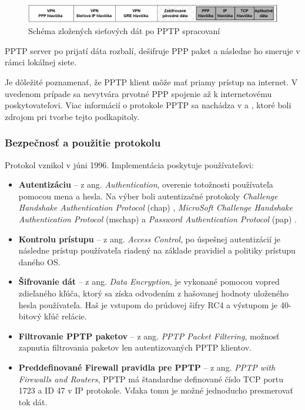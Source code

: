 \begin{figure}[!h]
	\centering
	\includegraphics[width=\textwidth]{figures/pptpdat}
	\caption{Schéma zložených sieťových dát po PPTP spracovaní}
	\label{pptpdat}
\end{figure}

PPTP server po prijatí dáta rozbalí, dešifruje PPP paket a následne ho smeruje v rámci lokálnej siete.

Je dôležité poznamenať, že PPTP klient môže mať priamy prístup na internet. V uvedenom prípade sa nevytvára prvotné PPP spojenie až k internetovému poskytovateľovi.
Viac informácií o protokole PPTP sa nachádza v \cite{rfc2637} a \cite{pptp}, ktoré boli zdrojom pri tvorbe tejto podkapitoly.
\subsubsection{Bezpečnosť a použitie protokolu} 
Protokol vznikol v júni 1996. Implementácia poskytuje používateľovi:
\begin{itemize}
	\item{\textbf{Autentizáciu}} -- z ang. \textit{Authentication}, overenie totožnosti používateľa pomocou mena a hesla. Na výber boli autentizačné protokoly \textit{Challenge Handshake Authentication Protocol} (\acrshort{chap}) \cite{chap}, \textit{MicroSoft Challenge Handshake Authentication Protocol} (\acrshort{mschap}) \cite{mschap} a \textit{Password Authentication Protocol} (\acrshort{pap}) \cite{pap}.  
	\item{\textbf{Kontrolu prístupu}} -- z ang. \textit{Access Control}, po úspešnej autentizácií je následne prístup používateľa riadený na základe pravidiel a politiky prístupu daného OS. 
	\item{\textbf{Šifrovanie dát}} -- z ang. \textit{Data Encryption}, je vykonané pomocou vopred zdieľaného kľúča, ktorý sa získa odvodením z hašovanej hodnoty uloženého hesla používateľa. Haš je vstupom do prúdovej šifry RC4 \cite{rc4} a výstupom je  40-bitový kľúč relácie. 
	\item{\textbf{Filtrovanie PPTP paketov}} -- z ang. \textit{PPTP Packet Filtering}, možnosť zapnutia filtrovania paketov len autentizovaných PPTP klientov.
	\item{\textbf{Preddefinované Firewall pravidla pre PPTP}} -- z ang. \textit{PPTP with Firewalls and Routers}, PPTP má štandardne definované číslo TCP portu 1723 a ID 47 v IP protokole. Vďaka tomu je možné jednoducho presmerovať tok dát.
\end{itemize} 

